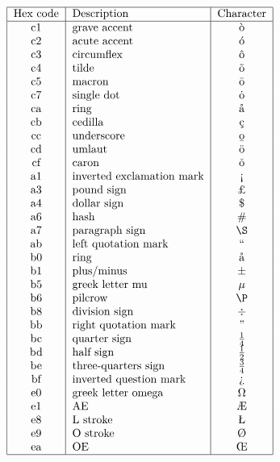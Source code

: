 \begin{table}[tp]
\small
\[\begin{tabular}{|c|l|c|}
\hline 
Hex code & Description & Character \\
\hline 
c1 & grave accent      	& \`{o} \\
c2 & acute accent	& \'{o} \\
c3 & circumflex		& \^{o} \\
c4 & tilde		& \~{o} \\
c5 & macron		& \={o} \\
c7 & single dot		& \.{o} \\
ca & ring		& \aa \\
cb & cedilla		& \c{c} \\
cc & underscore		& \b{o} \\
cd & umlaut		& \"{o} \\
cf & caron		& \v{o} \\
a1 & inverted exclamation mark	 & !` \\
a3 & pound sign			 & \pounds \\
a4 & dollar sign		 & \$ \\
a6 & hash			 & \# \\
a7 & paragraph sign		 & \S \\
ab & left quotation mark	 & `` \\
b0 & ring			 & \aa \\
b1 & plus/minus			 & $\pm$ \\
b5 & greek letter mu		 & $\mu$\\
b6 & pilcrow			 & \P \\
b8 & division sign		 & $\div$ \\
bb & right quotation mark	 & '' \\
bc & quarter sign		 & $\frac{1}{4}$ \\
bd & half sign			 & $\frac{1}{2}$ \\
be & three-quarters sign	 & $\frac{3}{4}$ \\
bf & inverted question mark	 & ?` \\
e0 & greek letter omega		 & $\Omega$ \\
e1 & AE				 & \AE \\
e8 & L stroke			 & \L \\
e9 & O stroke			 & \O \\
ea & OE				 & \OE \\
\hline 
\end{tabular}
\]
\caption{T.61 Character Codes}
\label{T61fig}
\end{table}

